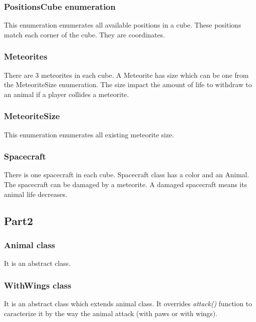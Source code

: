 \subsubsection{PositionsCube enumeration}

This enumeration enumerates all available positions in a cube. 
These positions match each corner of the cube.
They are coordinates.

\subsubsection{Meteorites}

There are 3 meteorites in each cube. 
A Meteorite has size which can be one from the MeteoriteSize enumeration.
The size impact the amount of life to withdraw to an animal if a player collides a meteorite.

\subsubsection{MeteoriteSize}

This enumeration enumerates all existing meteorite size.

\subsubsection{Spacecraft}

There is one spacecraft in each cube.
Spacecraft class has a color and an Animal.
The spacecraft can be damaged by a meteorite.
A damaged spacecraft means its animal life decreases.

\subsection{Part2}

\subsubsection{Animal class}

It is an abstract class.

\subsubsection{WithWings class}

It is an abstract class which extends animal class.
It overrides \textit{attack()} function to caracterize it by the way the animal attack (with paws or with wings).

